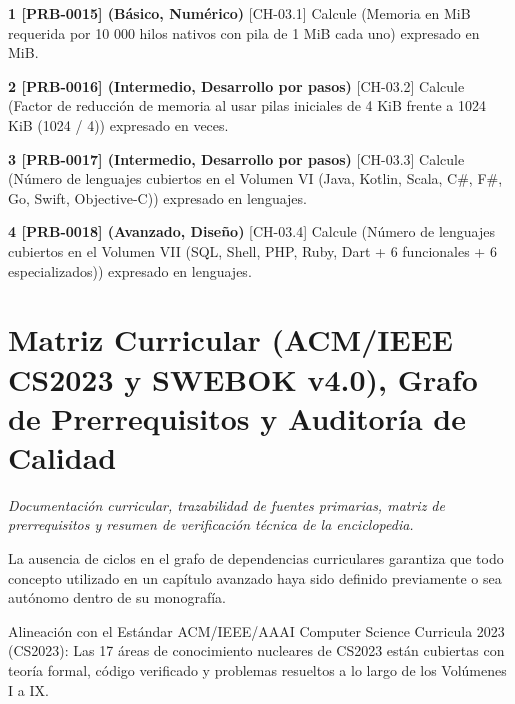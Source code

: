 \documentclass{book}
\begin{document}
\begin{tcolorbox}[title={Ejercicios}, studiumworked, breakable]

\noindent\textbf{1 [PRB-0015] (Básico, Numérico)}
[CH-03.1] Calcule (Memoria en MiB requerida por 10 000 hilos nativos con pila de 1 MiB cada uno) expresado en MiB.

\noindent\textbf{2 [PRB-0016] (Intermedio, Desarrollo por pasos)}
[CH-03.2] Calcule (Factor de reducción de memoria al usar pilas iniciales de 4 KiB frente a 1024 KiB (1024 / 4)) expresado en veces.

\noindent\textbf{3 [PRB-0017] (Intermedio, Desarrollo por pasos)}
[CH-03.3] Calcule (Número de lenguajes cubiertos en el Volumen VI (Java, Kotlin, Scala, C\#, F\#, Go, Swift, Objective-C)) expresado en lenguajes.

\noindent\textbf{4 [PRB-0018] (Avanzado, Diseño)}
[CH-03.4] Calcule (Número de lenguajes cubiertos en el Volumen VII (SQL, Shell, PHP, Ruby, Dart + 6 funcionales + 6 especializados)) expresado en lenguajes.
\end{tcolorbox}

\chapter{Matriz Curricular (ACM/IEEE CS2023 y SWEBOK v4.0), Grafo de Prerrequisitos y Auditoría de Calidad}
\label{chap:ch-04}

\noindent\textit{Documentación curricular, trazabilidad de fuentes primarias, matriz de prerrequisitos y resumen de verificación técnica de la enciclopedia.}

\begin{tcolorbox}[title={Consejo}, studiumtip, breakable]

La ausencia de ciclos en el grafo de dependencias curriculares garantiza que todo concepto utilizado en un capítulo avanzado haya sido definido previamente o sea autónomo dentro de su monografía.
\end{tcolorbox}

\begin{tcolorbox}[title={Definición}, studiumdef, breakable]

Alineación con el Estándar ACM/IEEE/AAAI Computer Science Curricula 2023 (CS2023): Las 17 áreas de conocimiento nucleares de CS2023 están cubiertas con teoría formal, código verificado y problemas resueltos a lo largo de los Volúmenes I a IX.
\end{tcolorbox}
\end{document}
